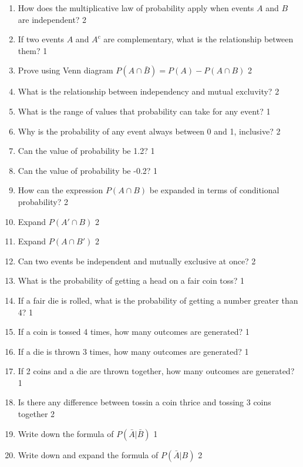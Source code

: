\documentclass[a4paper,oneside, margin=1.4in]{book}
\begin{document}
\begin{enumerate}
\item How does the multiplicative law of probability apply when events \( A \) and \( B \) are independent? \hfill 2

\item If two events \( A \) and \( A^c \) are complementary, what is the relationship between them? \hfill 1

\item Prove using Venn diagram $P(A\cap \bar B) = P(A) - P(A\cap B)$ \hfill 2

 \item 	What is the relationship between independency and mutual excluvity? \hfill 2

\item What is the range of values that probability can take for any event? \hfill 1

\item Why is the probability of any event always between 0 and 1, inclusive? \hfill 2

\item Can the value of probability be 1.2? \hfill 1

\item Can the value of probability be -0.2? \hfill 1

\item How can the expression \( P(A \cap B) \) be expanded in terms of conditional probability? \hfill 2

\item Expand \( P(A' \cap B) \) \hfill 2

\item Expand \( P(A \cap B') \) \hfill 2

\item Can two events be independent and mutually exclusive at once? \hfill 2

\item What is the probability of getting a head on a fair coin toss? \hfill 1

\item If a fair die is rolled, what is the probability of getting a number greater than 4? \hfill 1

\item If a coin is tossed 4 times, how many outcomes are generated? \hfill 1

\item If a die is thrown 3 times, how many outcomes are generated? \hfill 1

\item If 2 coins and a die are thrown together, how many outcomes are generated? \hfill 1

\item Is there any difference between tossin a coin thrice and tossing 3 coins together \hfill 2

\item Write down the formula of $P(\bar A | \bar B)$ \hfill 1

\item Write down and expand the formula of $P(\bar A | B)$ \hfill 2


  \end{enumerate}
\end{document}
